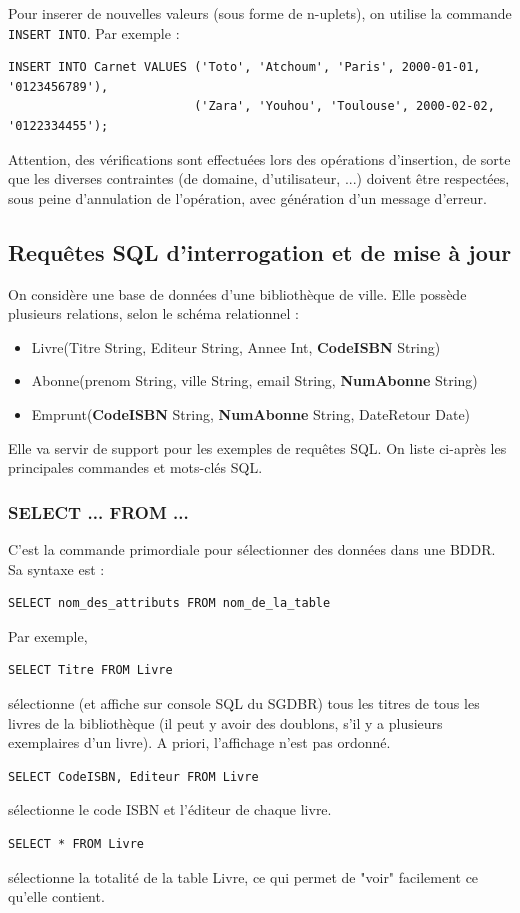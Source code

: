 \documentclass[11pt,a4paper,french,twoside]{PMCours}
\begin{document}
Pour inserer de nouvelles valeurs (sous forme de n-uplets), on utilise la commande \verb'INSERT INTO'. Par exemple :
\begin{verbatim}
INSERT INTO Carnet VALUES ('Toto', 'Atchoum', 'Paris', 2000-01-01, '0123456789'),
                          ('Zara', 'Youhou', 'Toulouse', 2000-02-02, '0122334455');
\end{verbatim}

Attention, des vérifications sont effectuées lors des opérations d'insertion, de sorte que les diverses contraintes (de domaine, d'utilisateur, ...) doivent être respectées, sous peine d'annulation de l'opération, avec génération d'un message d'erreur.


\subsection{Requêtes SQL d'interrogation et de mise à jour}


On considère une base de données d'une bibliothèque de ville. Elle possède plusieurs relations, selon le schéma relationnel :
\begin{itemize}
 \item Livre(Titre String, Editeur String, Annee Int, \textbf{CodeISBN} String) 
 \item Abonne(prenom String, ville String, email String, \textbf{NumAbonne} String)
 \item Emprunt(\textbf{CodeISBN} String, \textbf{NumAbonne} String, DateRetour Date)
\end{itemize}
Elle va servir de support pour les exemples de requêtes SQL. On liste ci-après les principales commandes et mots-clés SQL.


\subsubsection*{SELECT ... FROM ...}

C'est la commande primordiale pour sélectionner des données dans une BDDR. Sa syntaxe est :
\begin{verbatim}
SELECT nom_des_attributs FROM nom_de_la_table
\end{verbatim}
Par exemple,
\begin{verbatim}
SELECT Titre FROM Livre
\end{verbatim}
sélectionne (et affiche sur console SQL du SGDBR) tous les titres de tous les livres de la bibliothèque (il peut y avoir des doublons, s'il y a plusieurs exemplaires d'un livre). A priori, l'affichage n'est pas ordonné.
\begin{verbatim}
SELECT CodeISBN, Editeur FROM Livre
\end{verbatim}
sélectionne le code ISBN et l'éditeur de chaque livre.
\begin{verbatim}
SELECT * FROM Livre
\end{verbatim}
sélectionne la totalité de la table Livre, ce qui permet de "voir" facilement ce qu'elle contient.
\end{document}
